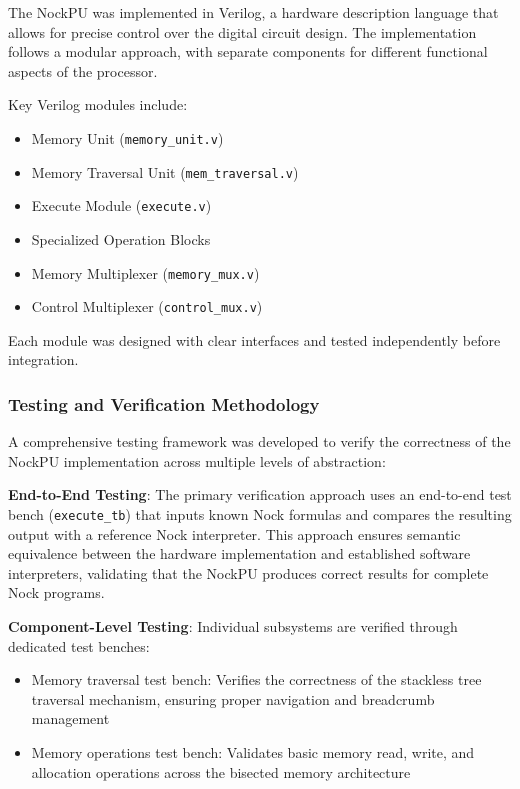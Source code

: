 \documentclass[twoside]{article}
\begin{document}
The NockPU was implemented in Verilog, a hardware description language that allows for precise control over the digital circuit design. The implementation follows a modular approach, with separate components for different functional aspects of the processor.

Key Verilog modules include:
\begin{itemize}
  \item Memory Unit (\texttt{memory\_unit.v})
  \item Memory Traversal Unit (\texttt{mem\_traversal.v})
  \item Execute Module (\texttt{execute.v})
  \item Specialized Operation Blocks
  \item Memory Multiplexer (\texttt{memory\_mux.v})
  \item Control Multiplexer (\texttt{control\_mux.v})
\end{itemize}

\noindent
Each module was designed with clear interfaces and tested independently before integration.

\subsubsection{Testing and Verification Methodology}

A comprehensive testing framework was developed to verify the correctness of the NockPU implementation across multiple levels of abstraction:

\textbf{End-to-End Testing}: The primary verification approach uses an end-to-end test bench (\texttt{execute\_tb}) that inputs known Nock formulas and compares the resulting output with a reference Nock interpreter. This approach ensures semantic equivalence between the hardware implementation and established software interpreters, validating that the NockPU produces correct results for complete Nock programs.

\textbf{Component-Level Testing}: Individual subsystems are verified through dedicated test benches:
\begin{itemize}
  \item Memory traversal test bench: Verifies the correctness of the stackless tree traversal mechanism, ensuring proper navigation and breadcrumb management
  \item Memory operations test bench: Validates basic memory read, write, and allocation operations across the bisected memory architecture
\end{itemize}
\end{document}
